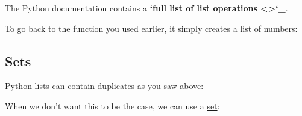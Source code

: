The Python documentation contains a {\color{red}\bfseries{}{}`full list of list operations \textless{}\textgreater{}{}`\_}.

To go back to the  function you used earlier, it simply
creates a list of numbers:

\begin{sphinxVerbatim}[commandchars=\\\{\}]
  
\end{sphinxVerbatim}


\subsection{Sets}
\label{\detokenize{lesson/prg/python_intro:sets}}
Python lists can contain duplicates as you saw above:

\begin{sphinxVerbatim}[commandchars=\\\{\}]
  \PYG{p}{[}     \PYG{p}{]}
\end{sphinxVerbatim}

When we don't want this to be the case, we can use a \href{https://docs.python.org/2/library/stdtypes.html\#set}{set}:

\begin{sphinxVerbatim}[commandchars=\\\{\}]
  
\end{sphinxVerbatim}

